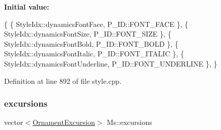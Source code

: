 {\bfseries Initial value\+:}
\begin{DoxyCode}
\{
      \{ StyleIdx::dynamicsFontFace,                   P\_ID::FONT\_FACE              \},
      \{ StyleIdx::dynamicsFontSize,                   P\_ID::FONT\_SIZE              \},
      \{ StyleIdx::dynamicsFontBold,                   P\_ID::FONT\_BOLD              \},
      \{ StyleIdx::dynamicsFontItalic,                 P\_ID::FONT\_ITALIC            \},
      \{ StyleIdx::dynamicsFontUnderline,              P\_ID::FONT\_UNDERLINE         \},
      \}
\end{DoxyCode}


Definition at line 892 of file style.\+cpp.

\mbox{\label{namespace_ms_a38b8f6869117b5f81653a89d245a03e7}} 
\subsubsection{\texorpdfstring{excursions}{excursions}}
{\footnotesize\ttfamily vector$<$\hyperlink{struct_ms_1_1_ornament_excursion}{Ornament\+Excursion}$>$ Ms\+::excursions}

